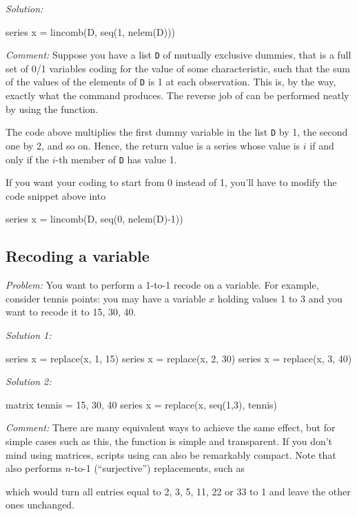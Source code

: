 \emph{Solution:}
\begin{code}
series x = lincomb(D, seq(1, nelem(D)))
\end{code}

\emph{Comment:} Suppose you have a list \texttt{D} of mutually
exclusive dummies, that is a full set of 0/1 variables coding for the
value of some characteristic, such that the sum of the values of the
elements of \texttt{D} is 1 at each observation. This is, by the way,
exactly what the  command produces.  The reverse job of
 can be performed neatly by using the 
function.

The code above multiplies the first dummy variable in the list
\texttt{D} by 1, the second one by 2, and so on. Hence, the return
value is a series whose value is $i$ if and only if the $i$-th member
of \texttt{D} has value 1.

If you want your coding to start from 0 instead of 1, you'll have to
modify the code snippet above into
\begin{code}
series x = lincomb(D, seq(0, nelem(D)-1))
\end{code}

\subsection{Recoding a variable}

\emph{Problem:} You want to perform a 1-to-1 recode on a variable. For
example, consider tennis points: you may have a variable $x$ holding
values 1 to 3 and you want to recode it to 15, 30, 40. 

\emph{Solution 1:}
\begin{code}
series x = replace(x, 1, 15)
series x = replace(x, 2, 30)
series x = replace(x, 3, 40)
\end{code}

\emph{Solution 2:}
\begin{code}
matrix tennis = {15, 30, 40}
series x = replace(x, seq(1,3), tennis)
\end{code}

\emph{Comment:} There are many equivalent ways to achieve the same
effect, but for simple cases such as this, the  function
is simple and transparent. If you don't mind using matrices, scripts
using  can also be remarkably compact. Note that
 also performs $n$-to-1 (``surjective'') replacements,
such as
\begin{code}
series x = replace{z, {2, 3, 5, 11, 22, 33}, 1)  
\end{code}
which would turn all entries equal to 2, 3, 5, 11, 22 or 33 to 1 and
leave the other ones unchanged.

